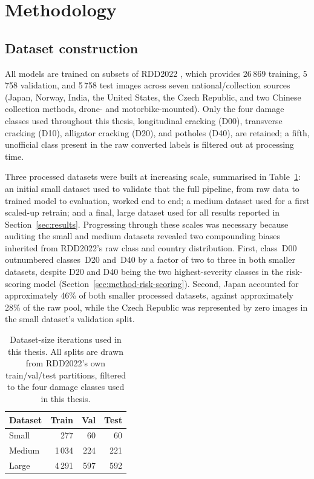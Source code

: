 \documentclass[10pt,a4paper,twocolumn]{article}
\begin{document}
\section{Methodology}
\label{sec:methods}

\subsection{Dataset construction}
\label{sec:method-dataset}

All models are trained on subsets of RDD2022 \citep{arya2024rdd2022},
which provides 26\,869 training, 5\,758 validation, and 5\,758 test
images across seven national/collection sources (Japan, Norway, India,
the United States, the Czech Republic, and two Chinese collection
methods, drone- and motorbike-mounted). Only the four damage classes used
throughout this thesis, longitudinal cracking (D00), transverse cracking
(D10), alligator cracking (D20), and potholes (D40), are retained; a
fifth, unofficial class present in the raw converted labels is filtered
out at processing time.

Three processed datasets were built at increasing scale, summarised in
Table~\ref{tab:dataset-iterations}: an initial small dataset used to
validate that the full pipeline, from raw data to trained model to
evaluation, worked end to end; a medium dataset used for a first
scaled-up retrain; and a final, large dataset used for all results
reported in Section~\ref{sec:results}. Progressing through these scales
was necessary because auditing the small and medium datasets revealed two
compounding biases inherited from RDD2022's raw class and country
distribution. First, class~D00 outnumbered classes~D20 and~D40 by a
factor of two to three in both smaller datasets, despite D20 and D40
being the two highest-severity classes in the risk-scoring model
(Section~\ref{sec:method-risk-scoring}). Second, Japan accounted for
approximately 46\% of both smaller processed datasets, against
approximately 28\% of the raw pool, while the Czech Republic was
represented by zero images in the small dataset's validation split.

\begin{table}[t]
  \centering
  \small
  \caption{Dataset-size iterations used in this thesis. All splits are
  drawn from RDD2022's own train/val/test partitions, filtered to the
  four damage classes used in this thesis.}
  \label{tab:dataset-iterations}
  \begin{tabular}{lrrr}
    \toprule
    Dataset & Train & Val & Test \\
    \midrule
    Small  & 277   & 60  & 60  \\
    Medium & 1\,034 & 224 & 221 \\
    Large  & 4\,291 & 597 & 592 \\
    \bottomrule
  \end{tabular}
\end{table}
\end{document}
